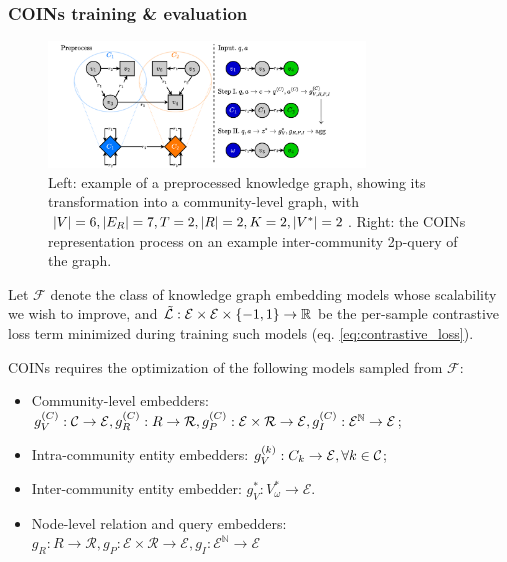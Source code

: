 \subsubsection{COINs training \& evaluation}

\begin{figure}%
    \centering
    \includegraphics[width=0.75\textwidth]{figures/coins/coins.pdf}
    \caption[Example of a preprocessed knowledge graph and the COINs representation process on an example query.]{Left: example of a preprocessed knowledge graph, showing its transformation into a community-level graph, with $\mathopen{}\left|V\right|=6, \mathopen{}\left|E_R\right|=7, T=2, \mathopen{}\left|R\right|=2, K=2, \mathopen{}\left|V^*\right|=2$. Right: the COINs representation process on an example inter-community 2p-query of the graph.}
    \label{fig:community_preprocessing}
\end{figure}

Let $\mathcal{F}$ denote the class of knowledge graph embedding models whose scalability we wish to improve, and $\tilde{\mathcal{L}}: \mathcal{E} \times \mathcal{E} \times \mathopen{}\left\{-1,1\right\} \to \mathbb{R}$ be the per-sample contrastive loss term minimized during training such models (eq. \eqref{eq:contrastive_loss}). 

COINs requires the optimization of the following models sampled from $\mathcal{F}$:
\begin{itemize}
    \item {Community-level embedders}: $g_V^{\mathopen{}\left(C\right)}: \mathcal{C} \to \mathcal{E}, g_R^{\mathopen{}\left(C\right)}: R \to \mathcal{R}, g_P^{\mathopen{}\left(C\right)}: \mathcal{E} \times \mathcal{R} \to \mathcal{E}, g_I^{\mathopen{}\left(C\right)}: \mathcal{E}^{\mathbb{N}} \to \mathcal{E}$;
    \item {Intra-community entity embedders}: $g_V^{\mathopen{}\left(k\right)}: C_k \to \mathcal{E}, \forall k \in \mathcal{C}$;
    \item {Inter-community entity embedder}: $g_V^{*}: V_{\omega}^* \to \mathcal{E}$. 
    \item {Node-level relation and query embedders}: $g_R: R \to \mathcal{R}, g_P: \mathcal{E} \times \mathcal{R} \to \mathcal{E}, g_I: \mathcal{E}^{\mathbb{N}} \to \mathcal{E}$
\end{itemize}

